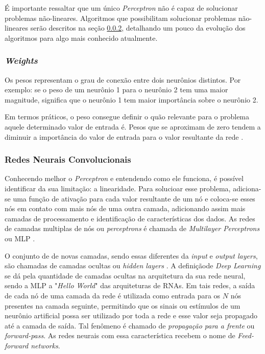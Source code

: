 É importante ressaltar que um único \textit{Perceptron} não é capaz de solucionar problemas não-lineares. Algoritmos que possibilitam solucionar problemas não-lineares serão descritos na seção \ref{sssec:cnn}, detalhando um pouco da evolução dos algoritmos para algo mais conhecido atualmente.

\subsubsection{\textit{Weights}}

Os pesos representam o grau de conexão entre dois neurônios distintos. Por exemplo: se o peso de um neurônio 1 para o neurônio 2 tem uma maior magnitude, significa que o neurônio 1 tem maior importância sobre o neurônio 2.

Em termos práticos, o peso consegue definir o quão relevante para o problema aquele determinado valor de entrada é. Pesos que se aproximam de zero tendem a diminuir a importância do valor de entrada para o valor resultante da rede \cite{everything-about-nn}.

\subsubsection{Redes Neurais Convolucionais} \label{sssec:cnn}

Conhecendo melhor o \textit{Perceptron} e entendendo como ele funciona, é possível identificar da sua limitação: a linearidade. Para solucioar esse problema, adiciona-se uma função de ativação para cada valor resultante de um nó e coloca-se esses nós em contato com mais nós de uma outra camada, adicionando assim mais camadas de processamento e identificação de características dos dados. As redes de camadas multiplas de nós ou \textit{perceptrons} é chamada de \textit{Multilayer Perceptrons} ou MLP \cite{deep-learning-book-br}.

O conjunto de de novas camadas, sendo essas diferentes da \textit{input} e \textit{output layers}, são chamadas de camadas ocultas ou \textit{hidden layers} \cite{goodfellow-et-al-2016}. A definiçãode \textit{Deep Learning} se dá pela quantidade de camadas ocultas na arquitetura da sua rede neural, sendo a MLP a "\textit{Hello World}" das arquiteturas de RNAs. Em tais redes, a saída de cada nó de uma camada da rede é utilizada como entrada para os \(N\) nós presentes na camada seguinte, permitindo que os sinais ou estímulos de um neurônio artificial possa ser utilizado por toda a rede e esse valor seja propagado até a camada de saída. Tal fenômeno é chamado de \textit{propagação para a frente} ou \textit{forward-pass}. As redes neurais com essa característica recebem o nome de \textit{Feed-forward networks}.

